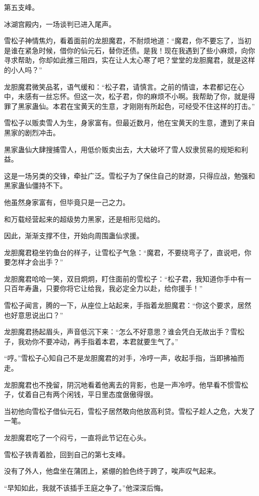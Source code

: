\begin{this_body}
第五支峰。

冰湖宫殿内，一场谈判已进入尾声。

雪松子神情焦灼，看着面前的龙胆魔君，不耐烦地道：“魔君，你不要忘了，当初是谁在紧急时候，借你的仙元石，替你还债。是我！现在我遇到了些小麻烦，向你寻求帮助，你却如此推三阻四，实在让人太心寒了吧？堂堂的龙胆魔君，就是这样的小人吗？”

龙胆魔君微笑品茗，语气缓和：“松子君，请慎言。之前的情谊，本君都记在心中，未感有一丝忘怀。但这一次，松子君，你的麻烦不小啊。我帮助了你，就是得罪了黑家蛊仙。本君在宝黄天的生意，才刚刚有所起色，可经受不住这样的打击。”

雪松子以贩卖雪人为生，身家富有。但最近数月，他在宝黄天的生意，遭到了来自黑家的剧烈冲击。

黑家蛊仙大肆搜捕雪人，用低价贩卖出去，大大破坏了雪人奴隶贸易的规矩和利益。

这是一场另类的交锋，牵扯广泛。雪松子为了保住自己的财源，只得应战，勉强和黑家蛊仙僵持不下。

他虽然身家富有，但毕竟只是一己之力。

和万载经营起来的超级势力黑家，还是相形见绌的。

因此，渐渐支撑不住，开始向周围蛊仙求援。

龙胆魔君稳坐钓鱼台的样子，让雪松子气急：“魔君，不要绕弯子了，直说吧，你要怎样才会出手？”

龙胆魔君哈哈一笑，双目炯炯，盯住面前的雪松子：“松子君，我知道你手中有一只百年寿蛊，只要你将它让给我，我必定全力以赴，给你援手！”

雪松子闻言，腾的一下，从座位上站起来，手指着龙胆魔君：“你这个要求，居然也好意思说出口？”

龙胆魔君扬起眉头，声音低沉下来：“怎么不好意思？谁会凭白无故出手？雪松子，我劝你不要冲动，再手指着本君，本君就要生气了。”

“哼。”雪松子心知自己不是龙胆魔君的对手，冷哼一声，收起手指，当即拂袖而走。

龙胆魔君也不挽留，阴沉地看着他离去的背影，也是一声冷哼。他早看不惯雪松子，仗着自己有两个闲钱，平日里态度倨傲得很。

当初他向雪松子借仙元石，雪松子居然敢向他放高利贷。雪松子趁人之危，大发了一笔。

龙胆魔君吃了一个闷亏，一直将此节记在心头。

雪松子铁青着脸，回到自己的第七支峰。

没有了外人，他盘坐在蒲团上，紧绷的脸色终于跨了，唉声叹气起来。

“早知如此，我就不该插手王庭之争了。”他深深后悔。


\end{this_body}

